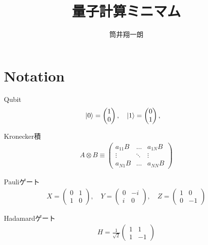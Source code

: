\documentclass[]{ltjsarticle}
\begin{document}
\title{量子計算ミニマム}


\author{筒井翔一朗}


\maketitle
\tableofcontents


\section{Notation}
Qubit
\begin{align}
    \ket{0} 
    = 
    \begin{pmatrix}
    1 \\ 0    
    \end{pmatrix}, \quad 
    \ket{1} 
    = 
    \begin{pmatrix}
    0 \\ 1    
    \end{pmatrix}, \quad 
\end{align}

Kronecker積
\begin{align}
    A \otimes B 
    \equiv
    \begin{pmatrix}
        a_{11}B & \dots & a_{1N}B \\
        \vdots & \ddots & \vdots \\
        a_{N1}B & \dots & a_{NN}B
    \end{pmatrix}
\end{align}

Pauliゲート
\begin{align}
    X = 
    \begin{pmatrix}
    0 & 1 \\ 1 & 0     
    \end{pmatrix},\quad 
    Y = 
    \begin{pmatrix}
    0 & -i \\ i & 0     
    \end{pmatrix},\quad 
    Z = 
    \begin{pmatrix}
    1 & 0 \\ 0 & -1     
    \end{pmatrix} 
\end{align}

Hadamardゲート
\begin{align}
    H 
    = 
    \frac{1}{\sqrt{2}}
    \begin{pmatrix}
        1 & 1 \\
        1 & -1
    \end{pmatrix}
\end{align}
\end{document}
